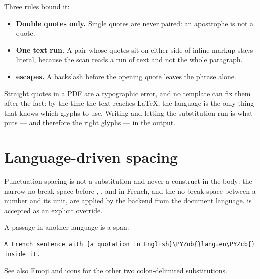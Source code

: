 \documentclass[a4paper,twoside]{article}
\begin{document}
Three rules bound it:
\begin{itemize}
\item \textbf{Double quotes only.} Single quotes are never paired: an apostrophe is not
a quote.
\item \textbf{One text run.} A pair whose quotes sit on either side of inline markup
stays literal, because the scan reads a run of text and not the whole
paragraph.
\item \textbf{ escapes.} A backslash before the opening quote leaves the phrase
alone.
\end{itemize}
\begin{tscallout}[kind=tip, title={Why this matters for print}]
Straight quotes in a PDF are a typographic error, and no template can fix
them after the fact: by the time the text reaches \LaTeX{}, the language is
the only thing that knows which glyphs to use. Writing  and letting
the substitution run is what puts  --- and therefore the right
glyphs --- in the output.
\end{tscallout}
\section{Language-driven spacing}
Punctuation spacing is not a substitution and never a construct in the body:
the narrow no-break space before \tscodeinline{;}, \tscodeinline{:},  and \tscodeinline{!} in French, and the
no-break space between a number and its unit, are applied by the backend from
the document language.  is accepted as an explicit override.

A passage in another language is a span:
\begin{tscode}[lang=md, engine=pygments]
\begin{Verbatim}[commandchars=\\\{\},breaklines, breakanywhere, commandchars=\\\{\}]
A French sentence with [a quotation in English]\PYZob{}lang=en\PYZcb{} inside it.
\end{Verbatim}
\end{tscode}
See also Emoji and icons for the other two colon-delimited
substitutions.
\end{document}
